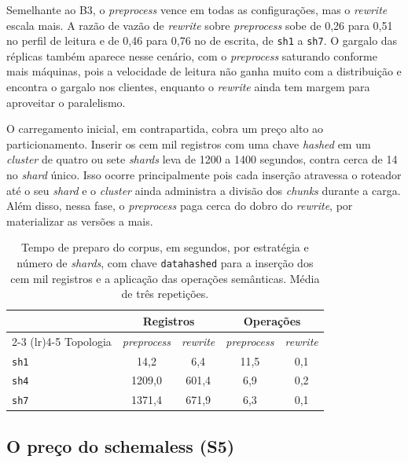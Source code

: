 Semelhante ao B3, o \textit{preprocess} vence em todas as configurações, mas o \textit{rewrite} escala mais. A razão de vazão de \textit{rewrite} sobre \textit{preprocess} sobe de 0,26 para 0,51 no perfil de leitura e de 0,46 para 0,76 no de escrita, de \texttt{sh1} a \texttt{sh7}. O gargalo das réplicas também aparece nesse cenário, com o \textit{preprocess} saturando conforme mais máquinas, pois a velocidade de leitura não ganha muito com a distribuição e encontra o gargalo nos clientes, enquanto o \textit{rewrite} ainda tem margem para aproveitar o paralelismo.

O carregamento inicial, em contrapartida, cobra um preço alto ao particionamento. Inserir os cem mil registros com uma chave \textit{hashed} em um \textit{cluster} de quatro ou sete \textit{shards} leva de 1200 a 1400 segundos, contra cerca de 14 no \textit{shard} único. Isso ocorre principalmente pois cada inserção atravessa o roteador até o seu \textit{shard} e o \textit{cluster} ainda administra a divisão dos \textit{chunks} durante a carga. Além disso, nessa fase, o \textit{preprocess} paga cerca do dobro do \textit{rewrite}, por materializar as versões a mais.

\begin{table}[htb]
  \centering
  \begin{tabular}{@{}l cc cc@{}}
    \toprule
    & \multicolumn{2}{c}{Registros} & \multicolumn{2}{c}{Operações} \\
    \cmidrule(lr){2-3} \cmidrule(lr){4-5}
    Topologia & \textit{preprocess} & \textit{rewrite} & \textit{preprocess} & \textit{rewrite} \\
    \midrule
    \texttt{sh1} &   14,2 &   6,4 & 11,5 & 0,1 \\
    \texttt{sh4} & 1209,0 & 601,4 &  6,9 & 0,2 \\
    \texttt{sh7} & 1371,4 & 671,9 &  6,3 & 0,1 \\
    \bottomrule
  \end{tabular}
  \caption{Tempo de preparo do corpus, em segundos, por estratégia e número de \textit{shards}, com chave \texttt{data}\textperiodcentered\texttt{hashed} para a inserção dos cem mil registros e a aplicação das operações semânticas. Média de três repetições.}
  \label{tab:res-s4-setup}
\end{table}

\subsection{O preço do schemaless (S5)}
\label{sec:res-s5}

